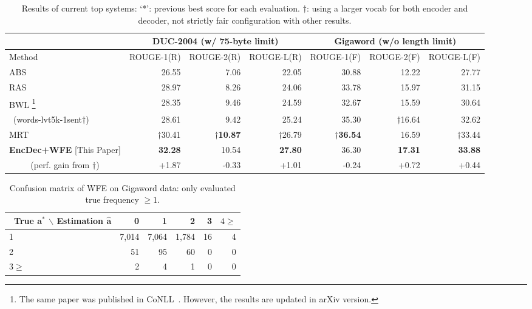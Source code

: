 \documentclass[11pt]{article}
\begin{document}
\begin{table*}[t]
 \small
 \centering
 \tabcolsep=2pt
 \begin{tabular}{l | r | r | r || r | r| r}
  \hline
   \             & \multicolumn{3}{c||}{DUC-2004 (w/ 75-byte limit)}
                  & \multicolumn{3}{c}{Gigaword (w/o length limit)}\\
  \hline
  Method & ROUGE-1(R) & ROUGE-2(R) & ROUGE-L(R) & ROUGE-1(F) & ROUGE-2(F) & ROUGE-L(F)\\
  \hline
  ABS \cite{rush-chopra-weston:2015:EMNLP}
                       & 26.55  & 7.06  & 22.05 & 30.88 & 12.22 & 27.77\\
  \hline
  RAS \cite{chopra-auli-rush:2016:N16-1}&
      28.97  & 8.26  & 24.06 & 33.78  & 15.97 & 31.15\\
  \hline
  BWL \cite{DBLP:journals/corr/NallapatiXZ16}\footnote{The same paper was published in CoNLL~\cite{nallapati-EtAl:2016:CoNLL}. However, the results are updated in arXiv version.}&
      28.35  & 9.46  & 24.59 & 32.67  & 15.59 & 30.64\\
  \,\,\,(words-lvt5k-1sent$\dagger$)  &
      28.61  & 9.42  &25.24  &35.30   &$\dagger$16.64 & 32.62 \\
  \hline
  MRT \cite{DBLP:journals/corr/AyanaSLS16}&
      $\dagger$30.41  & $\dagger$\bf 10.87  & $\dagger$26.79 & $\dagger$\bf 36.54  & 16.59 & $\dagger$33.44\\
  \hline
  {\bf EncDec+WFE} [This Paper] &\bf  32.28  & 10.54  &\bf 27.80
                                   & 36.30 &\bf 17.31  &\bf 33.88 \\
  \hline
   \hline
   \multicolumn{1}{c|}{ (perf. gain from $\dagger$)}
                              &      +1.87 &  -0.33 &   +1.01           &   -0.24 &  +0.72 &   +0.44 \\
   \hline
 \end{tabular}
 \caption{Results of current top systems: `*': previous best score for each evaluation. $\dagger$: using a larger vocab for both encoder and decoder, not strictly fair configuration with other results.}
 \label{table:topsystem}
\end{table*}
%
\begin{table}[t]
 \small
 \centering
 \tabcolsep=2pt
 \begin{tabular}{ l || r | r |r |r|r   }
  \hline 
  \  True $\bm{a}^*$ $\backslash$ Estimation $\hat{\bm{a}}$  &   0  & 1 &   2  & 3 & $4\geq$  \\
  \hline 
  1              &  7,014  & 7,064     &  1,784  & 16  & 4  \\
  \hline 
  2              &  51     &    95     &   60    & 0 & 0  \\
  \hline 
  $3 \geq$       &   2    &  4      &   1     & 0 & 0  \\
  \hline 
 \end{tabular}
 \caption{Confusion matrix of WFE on Gigaword data: only evaluated true frequency $\geq 1$.}
 \label{table:result_wordset}
\end{table}
\end{document}

